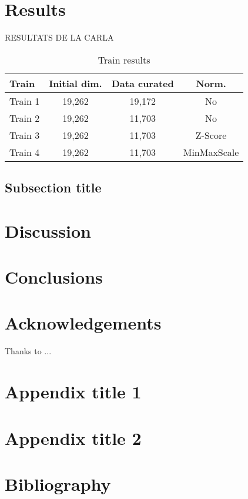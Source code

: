 \documentclass[final,times,twocolumn,article]{elsarticle}
\begin{document}
\section{Results}

RESULTATS DE LA CARLA 

\begin{table}
\centering
\begin{tabular}{l c c c} 
     \hline
     Train & Initial dim. & Data curated & Norm.\\ 
     \hline
     Train 1 & 19,262 & 19,172 & No\\
     \hline
     Train 2 & 19,262 & 11,703 & No \\
     \hline
     Train 3 & 19,262 & 11,703 & Z-Score\\ 
     \hline
     Train 4 & 19,262 & 11,703 & MinMaxScale\\ 
     \hline
    \end{tabular}
\caption{Train results
}
\label{Table1}
\end{table}


\subsection{Subsection title}





\section{Discussion}


\section{Conclusions}


\section*{Acknowledgements}
Thanks to ...

\appendix

\section{Appendix title 1}

\section{Appendix title 2}


\section{Bibliography}
 

\end{document}
